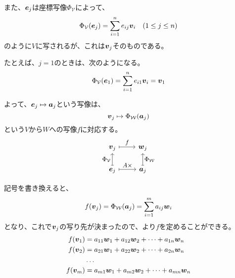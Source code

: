 \documentclass[../../../topic_linear-algebra]{subfiles}
\begin{document}
また、$\vb*{e}_j$は座標写像$\Phi_{\mathcal{V}}$によって、
\begin{equation*}
  \Phi_{\mathcal{V}}(\vb*{e}_j) = \sum_{i=1}^n e_{ij} \vb*{v}_i \quad (1 \leq j \leq n)
\end{equation*}
のように$V$に写されるが、これは$\vb*{v}_j$そのものである。

\begin{handout}[補足：$\Phi_{\mathcal{V}}(\vb*{e}_j) = \vb*{v}_j$の確認]
  たとえば、$j=1$のときは、次のようになる。
  \begin{equation*}
    \Phi_{\mathcal{V}}(\vb*{e}_1) = \sum_{i=1}^n e_{i1} \vb*{v}_i = \vb*{v}_1
  \end{equation*}
\end{handout}

\br

よって、$\vb*{e}_j \mapsto \vb*{a}_j$という写像は、
\begin{equation*}
  \vb*{v}_j \mapsto \Phi_{\mathcal{W}}(\vb*{a}_j)
\end{equation*}
という$V$から$W$への写像$f$に対応する。
\begin{equation}
  \begin{tikzcd}[every label/.append style = {font = \small}]
    \vb*{v}_j \arrow[r,mapsto,"f"] & \vb*{w}_j \\
    \vb*{e}_j \arrow[u,mapsto,"{\Phi_{\mathcal{V}}}"] \arrow[r,mapsto,"A \times"] & \vb*{a}_j \arrow[u,mapsto,"{\Phi_{\mathcal{W}}}"']
  \end{tikzcd}
\end{equation}

\br

記号を書き換えると、
\begin{equation*}
  f(\vb*{v}_j) = \Phi_{\mathcal{W}}(\vb*{a}_j) = \sum_{i=1}^m a_{ij} \vb*{w}_i
\end{equation*}
となり、これで$\vb*{v}_j$の写り先が決まったので、より$f$を定めることができる。
\begin{align*}
  f(\vb*{v}_1) &= a_{11}\vb*{w}_1 + a_{12}\vb*{w}_2 + \cdots + a_{1n}\vb*{w}_n \\
  f(\vb*{v}_2) &= a_{21}\vb*{w}_1 + a_{22}\vb*{w}_2 + \cdots + a_{2n}\vb*{w}_n \\
  & \ldots \\
  f(\vb*{v}_m) &= a_{m1}\vb*{w}_1 + a_{m2}\vb*{w}_2 + \cdots + a_{mn}\vb*{w}_n
\end{align*}
\end{document}
